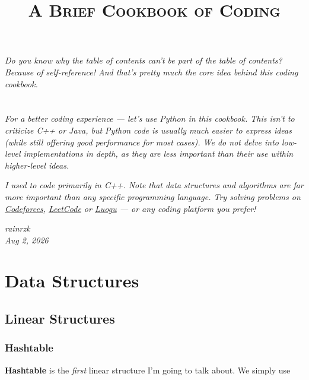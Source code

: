 \documentclass{article}
\title{\Huge{\textsc{A Brief Cookbook of Coding}}}
\author{}
\date{}
\begin{document}
\maketitle

\tableofcontents

\vspace{4ex}

\emph{Do you know why the table of contents can't be part of the table of contents? Because of self-reference! And that's pretty much the core idea behind this coding cookbook.}

\newpage

\section*{}

\emph{For a better coding experience --- let’s use Python in this cookbook. This isn’t to criticize C++ or Java, but Python code is usually much easier to express ideas (while still offering good performance for most cases). We do not delve into low-level implementations in depth, as they are less important than their use within higher-level ideas.}

\emph{I used to code primarily in C++. Note that data structures and algorithms are far more important than any specific programming language. Try solving problems on \href{https://codeforces.com/}{Codeforces}, \href{https://leetcode.com/}{LeetCode} or \href{https://www.luogu.com.cn/}{Luogu} --- or any coding platform you prefer!}

\begin{flushright}
    \emph{rainrzk} \\
    \emph{Aug 2, 2026}
\end{flushright}


\newpage

\section{Data Structures}

\subsection{Linear Structures}

\subsubsection{Hashtable}

\textbf{Hashtable} is the \emph{first} linear structure I'm going to talk about.
We simply use
\end{document}
